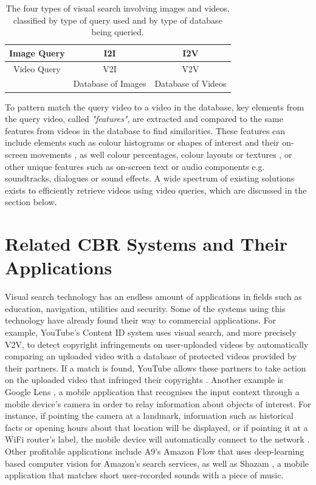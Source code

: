 \begin{table}[H]
\centering
\begin{tabular}{c|c|c|}
\hline
\multicolumn{1}{|c|}{Image Query} & I2I                & I2V                \\ \hline
\multicolumn{1}{|c|}{Video Query} & V2I                & V2V                \\ \hline
\multicolumn{1}{l|}{}             & Database of Images & Database of Videos \\ \cline{2-3} 
\end{tabular}
\caption{The four types of visual search involving images and videos, classified by type of query used and by type of database being queried.}
\label{table:visual_search_table}
\end{table}

To pattern match the query video to a video in the database, key elements from the query video, called \textit{"features"}, are extracted and compared to the same features from videos in the database to find similarities. These features can include elements such as colour histograms or shapes of interest and their on-screen movements \cite{patel2012}, as well colour percentages, colour layouts or textures \cite{petkovic2000}, or other unique features such as on-screen text or audio components e.g. soundtracks, dialogues or sound effects. A wide spectrum of existing solutions exists to efficiently retrieve videos using video queries, which are discussed in the section below.

\section{Related CBR Systems and Their Applications}
\label{sec:v2v_applications}

Visual search technology has an endless amount of applications in fields such as education, navigation, utilities and security. Some of the systems using this technology have already found their way to commercial applications. For example, YouTube's Content ID system uses visual search, and more precisely V2V, to detect copyright infringements on user-uploaded videos by automatically comparing an uploaded video with a database of protected videos provided by their partners. If a match is found, YouTube allows these partners to take action on the uploaded video that infringed their copyrights \cite{youtube-content-id-2012}. Another example is Google Lens \cite{google-lens}, a mobile application that recognises the input context through a mobile device's camera in order to relay information about objects of interest. For instance, if pointing the camera at a landmark, information such as historical facts or opening hours about that location will be displayed, or if pointing it at a WiFi router's label, the mobile device will automatically connect to the network \cite{villaboas-google-lens2017}. Other profitable applications include A9's Amazon Flow \cite{a9-visual-search} that uses deep-learning based computer vision for Amazon's search services, as well as Shazam \cite{shazam}, a mobile application that matches short user-recorded sounds with a piece of music.\\

